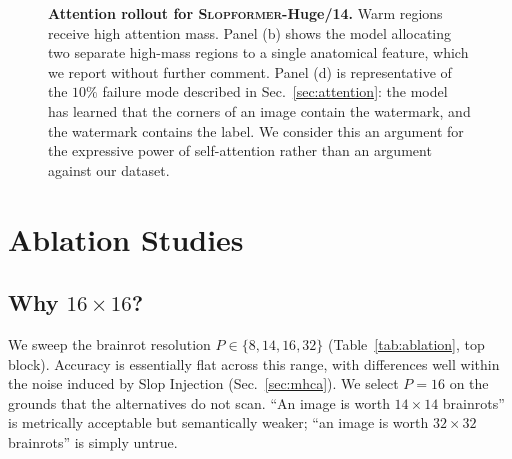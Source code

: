 \documentclass[10pt]{article}
\newcommand{\slop}{\textsc{Slopformer}}
\begin{document}
\begin{figure}[t]
\caption{\textbf{Attention rollout for \slop{}-Huge/14.} Warm regions receive
high attention mass. Panel (b) shows the model allocating two separate
high-mass regions to a single anatomical feature, which we report without
further comment. Panel (d) is representative of the $10\%$ failure mode
described in Sec.~\ref{sec:attention}: the model has learned that the corners
of an image contain the watermark, and the watermark contains the label. We
consider this an argument for the expressive power of self-attention rather
than an argument against our dataset.}
\label{fig:attn}
\end{figure}

\section{Ablation Studies}
\label{sec:ablations}

\subsection{Why $16\times16$?}
\label{sec:ablation-patch}

We sweep the brainrot resolution $P \in \{8, 14, 16, 32\}$
(Table~\ref{tab:ablation}, top block). Accuracy is essentially flat across this
range, with differences well within the noise induced by Slop Injection
(Sec.~\ref{sec:mhca}). We select $P=16$ on the grounds that the alternatives do
not scan. ``An image is worth $14\times14$ brainrots'' is metrically
acceptable but semantically weaker; ``an image is worth $32\times32$
brainrots'' is simply untrue.
\end{document}
